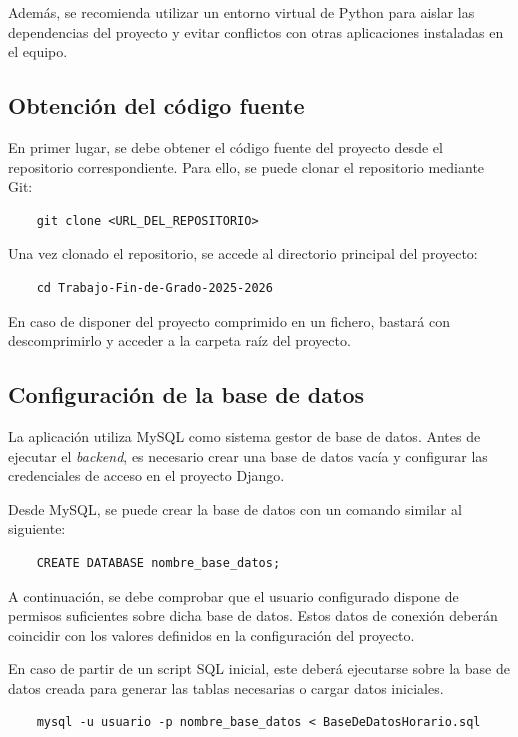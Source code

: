 Además, se recomienda utilizar un entorno virtual de Python para aislar las dependencias del proyecto y evitar conflictos con otras aplicaciones instaladas en el equipo.

\subsection{Obtención del código fuente}

En primer lugar, se debe obtener el código fuente del proyecto desde el repositorio correspondiente. Para ello, se puede clonar el repositorio mediante Git:

\begin{verbatim}
	git clone <URL_DEL_REPOSITORIO>
\end{verbatim}

Una vez clonado el repositorio, se accede al directorio principal del proyecto:

\begin{verbatim}
	cd Trabajo-Fin-de-Grado-2025-2026
\end{verbatim}

En caso de disponer del proyecto comprimido en un fichero, bastará con descomprimirlo y acceder a la carpeta raíz del proyecto.

\subsection{Configuración de la base de datos}

La aplicación utiliza MySQL como sistema gestor de base de datos. Antes de ejecutar el \textit{backend}, es necesario crear una base de datos vacía y configurar las credenciales de acceso en el proyecto Django.

Desde MySQL, se puede crear la base de datos con un comando similar al siguiente:

\begin{verbatim}
	CREATE DATABASE nombre_base_datos;
\end{verbatim}

A continuación, se debe comprobar que el usuario configurado dispone de permisos suficientes sobre dicha base de datos. Estos datos de conexión deberán coincidir con los valores definidos en la configuración del proyecto.

En caso de partir de un script SQL inicial, este deberá ejecutarse sobre la base de datos creada para generar las tablas necesarias o cargar datos iniciales.

\begin{verbatim}
	mysql -u usuario -p nombre_base_datos < BaseDeDatosHorario.sql
\end{verbatim}


